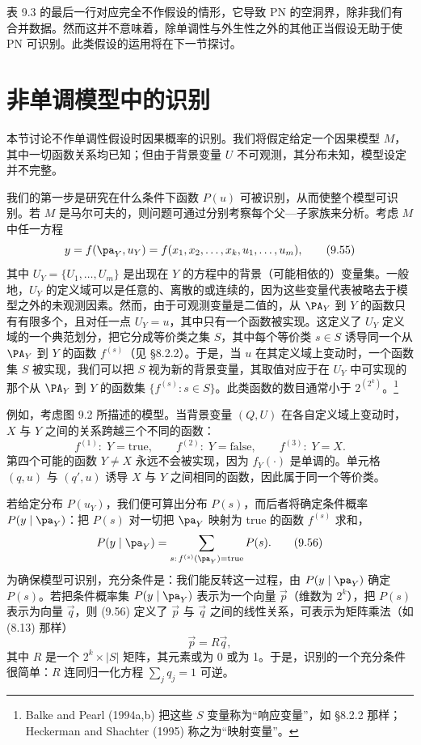 表 9.3 的最后一行对应完全不作假设的情形，它导致 PN 的空洞界，除非我们有合并数据。然而这并不意味着，除单调性与外生性之外的其他正当假设无助于使 PN 可识别。此类假设的运用将在下一节探讨。

\section{非单调模型中的识别}

本节讨论不作单调性假设时因果概率的识别。我们将假定给定一个因果模型 $M$，其中一切函数关系均已知；但由于背景变量 $U$ 不可观测，其分布未知，模型设定并不完整。

我们的第一步是研究在什么条件下函数 $P(u)$ 可被识别，从而使整个模型可识别。若 $M$ 是马尔可夫的，则问题可通过分别考察每个父—子家族来分析。考虑 $M$ 中任一方程
\begin{equation}
y=f(\pa_Y,u_Y)=f(x_1,x_2,\dots,x_k,u_1,\dots,u_m), \tag{9.55}
\end{equation}
其中 $U_Y=\{U_1,\dots,U_m\}$ 是出现在 $Y$ 的方程中的背景（可能相依的）变量集。一般地，$U_Y$ 的定义域可以是任意的、离散的或连续的，因为这些变量代表被略去于模型之外的未观测因素。然而，由于可观测变量是二值的，从 $\PA_Y$ 到 $Y$ 的函数只有有限多个，且对任一点 $U_Y=u$，其中只有一个函数被实现。这定义了 $U_Y$ 定义域的一个典范划分，把它分成等价类之集 $S$，其中每个等价类 $s\in S$ 诱导同一个从 $\PA_Y$ 到 $Y$ 的函数 $f^{(s)}$（见 \S 8.2.2）。于是，当 $u$ 在其定义域上变动时，一个函数集 $S$ 被实现，我们可以把 $S$ 视为新的背景变量，其取值对应于在 $U_Y$ 中可实现的那个从 $\PA_Y$ 到 $Y$ 的函数集 $\{f^{(s)}:s\in S\}$。此类函数的数目通常小于 $2^{(2^k)}$。\footnote{Balke and Pearl (1994a,b) 把这些 $S$ 变量称为“响应变量”，如 \S 8.2.2 那样；Heckerman and Shachter (1995) 称之为“映射变量”。}

例如，考虑图 9.2 所描述的模型。当背景变量 $(Q,U)$ 在各自定义域上变动时，$X$ 与 $Y$ 之间的关系跨越三个不同的函数：
\[
f^{(1)}:\;Y=\text{true},\qquad f^{(2)}:\;Y=\text{false},\qquad f^{(3)}:\;Y=X.
\]
第四个可能的函数 $Y\ne X$ 永远不会被实现，因为 $f_Y(\cdot)$ 是单调的。单元格 $(q,u)$ 与 $(q',u)$ 诱导 $X$ 与 $Y$ 之间相同的函数，因此属于同一个等价类。

若给定分布 $P(u_Y)$，我们便可算出分布 $P(s)$，而后者将确定条件概率 $P(y\mid\pa_Y)$：把 $P(s)$ 对一切把 $\pa_Y$ 映射为 true 的函数 $f^{(s)}$ 求和，
\begin{equation}
P(y\mid\pa_Y)=\sum_{s:\,f^{(s)}(\pa_Y)=\text{true}}P(s). \tag{9.56}
\end{equation}
为确保模型可识别，充分条件是：我们能反转这一过程，由 $P(y\mid\pa_Y)$ 确定 $P(s)$。若把条件概率集 $P(y\mid\pa_Y)$ 表示为一个向量 $\vec{p}$（维数为 $2^k$），把 $P(s)$ 表示为向量 $\vec{q}$，则 \textup{(9.56)} 定义了 $\vec{p}$ 与 $\vec{q}$ 之间的线性关系，可表示为矩阵乘法（如 \textup{(8.13)} 那样）
\begin{equation}
\vec{p}=R\vec{q}, \tag{9.57}
\end{equation}
其中 $R$ 是一个 $2^k\times|S|$ 矩阵，其元素或为 0 或为 1。于是，识别的一个充分条件很简单：$R$ 连同归一化方程 $\sum_j q_j=1$ 可逆。

